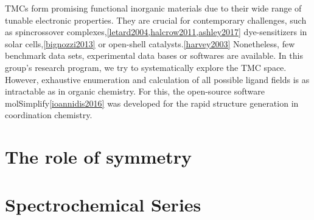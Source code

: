 \documentclass{article}
\begin{document}
TMCs form promising functional inorganic materials due to their wide range of tunable electronic properties. They are crucial for contemporary challenges, such as spincrossover complexes,\ref{letard2004,halcrow2011,ashley2017} dye-sensitizers in solar cells,\ref{bignozzi2013} or open-shell catalysts.\ref{harvey2003} Nonetheless, few benchmark data sets, experimental data bases or softwares are available. In this group's research program, we try to systematically explore the TMC space.  However, exhaustive enumeration and calculation of all possible ligand fields is as intractable as in organic chemistry. For this, the open-source software molSimplify\ref{ioannidis2016} was developed for the rapid structure generation in coordination chemistry. 

\section{The role of symmetry}



\section{Spectrochemical Series}
\end{document}
